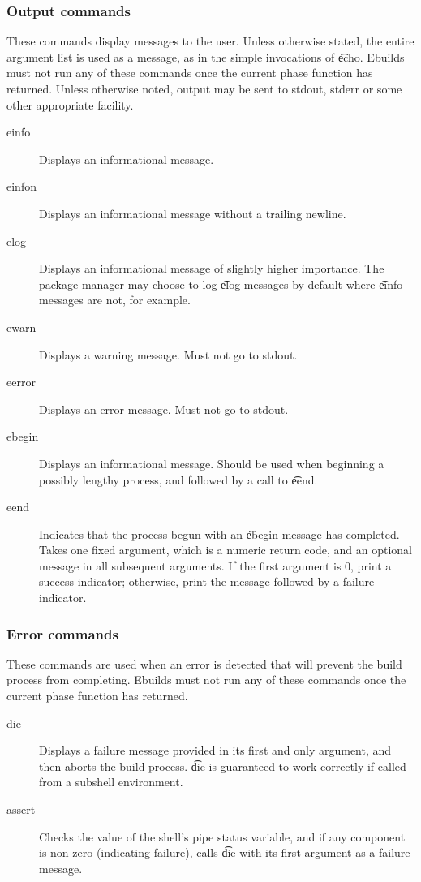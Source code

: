 \subsubsection{Output commands}
These commands display messages to the user. Unless otherwise stated, the entire argument list is
used as a message, as in the simple invocations of \t{echo}. Ebuilds must not run any of these
commands once the current phase function has returned. Unless otherwise noted, output may be sent to
stdout, stderr or some other appropriate facility.
\begin{description}
\item[einfo] Displays an informational message.
\item[einfon] Displays an informational message without a trailing newline.
\item[elog] Displays an informational message of slightly higher importance. The package
    manager may choose to log \t{elog} messages by default where \t{einfo} messages are not, for
    example.
\item[ewarn] Displays a warning message. Must not go to stdout.
\item[eerror] Displays an error message. Must not go to stdout.
\item[ebegin] Displays an informational message. Should be used when beginning a possibly
    lengthy process, and followed by a call to \t{eend}.
\item[eend] Indicates that the process begun with an \t{ebegin} message has completed. Takes one
    fixed argument, which is a numeric return code, and an optional message in all subsequent
    arguments.  If the first argument is 0, print a success indicator; otherwise, print the message
    followed by a failure indicator.
\end{description}

\subsubsection{Error commands}
These commands are used when an error is detected that will prevent the build process from
completing. Ebuilds must not run any of these commands once the current phase function has returned.
\begin{description}
\item[die] Displays a failure message provided in its first and only argument, and then aborts the
    build process. \t{die} is  guaranteed to work correctly if called from a subshell
    environment.
\item[assert] Checks the value of the shell's pipe status variable, and if any component is non-zero
    (indicating failure), calls \t{die} with its first argument as a failure message.
\end{description}

